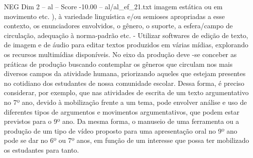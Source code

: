 \begin{textsample}{NEG Dim 2 – al – Score -10.00 – al/al\_ef\_21.txt}
imagem estática ou em movimento etc. ), à variedade linguística e/ou semioses apropriadas a esse contexto, os enunciadores envolvidos, o gênero, o suporte, a esfera/campo de circulação, adequação à norma-padrão etc. - Utilizar softwares de edição de texto, de imagem e de áudio para editar textos produzidos em várias mídias, explorando os recursos multimídias disponíveis.
No eixo da produção deve -se conceber as práticas de produção buscando contemplar os gêneros que circulam nos mais diversos campos da atividade humana, priorizando aqueles que estejam presentes no cotidiano dos estudantes de nossa comunidade escolar.
Dessa forma, é preciso considerar, por exemplo, que nas atividades de escrita de um texto argumentativo no 7º ano, devido à mobilização frente a um tema, pode envolver análise e uso de diferentes tipos de argumentos e movimentos argumentativos, que podem estar previstos para o 9º ano.
Da mesma forma, o manuseio de uma ferramenta ou a produção de um tipo de vídeo proposto para uma apresentação oral no 9º ano pode se dar no 6º ou 7º anos, em função de um interesse que possa ter mobilizado os estudantes para tanto.

\end{textsample}
